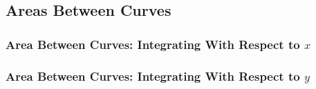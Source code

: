 \subsection{Areas Between Curves}

\subsubsection*{Area Between Curves: Integrating With Respect to \(x\)}

\subsubsection*{Area Between Curves: Integrating With Respect to \(y\)}